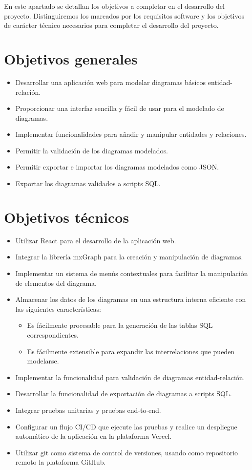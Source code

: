 
En este apartado se detallan los objetivos a completar en el desarrollo del proyecto. Distinguiremos los marcados por los requisitos software y los objetivos de carácter técnico necesarios para completar el desarrollo del proyecto.

\section{Objetivos generales}
\begin{itemize}
\tightlist
    \item Desarrollar una aplicación web para modelar diagramas básicos entidad-relación.
    \item Proporcionar una interfaz sencilla y fácil de usar para el modelado de diagramas.
    \item Implementar funcionalidades para añadir y manipular entidades y relaciones.
    \item Permitir la validación de los diagramas modelados.
    \item Permitir exportar e importar los diagramas modelados como JSON.
    \item Exportar los diagramas validados a scripts SQL.
\end{itemize}

\section{Objetivos técnicos}
\begin{itemize}
\tightlist
    \item Utilizar React para el desarrollo de la aplicación web.
    \item Integrar la librería mxGraph para la creación y manipulación de diagramas.
    \item Implementar un sistema de menús contextuales para facilitar la manipulación de elementos del diagrama.
    \item Almacenar los datos de los diagramas en una estructura interna eficiente con las siguientes características:
    \begin{itemize}
        \item Es fácilmente procesable para la generación de las tablas SQL correspondientes.
        \item Es fácilmente extensible para expandir las interrelaciones que pueden modelarse.
    \end{itemize}
    \item Implementar la funcionalidad para validación de diagramas entidad-relación.
    \item Desarrollar la funcionalidad de exportación de diagramas a scripts SQL.
    \item Integrar pruebas unitarias y pruebas end-to-end.
    \item Configurar un flujo CI/CD que ejecute las pruebas y realice un despliegue automático de la aplicación en la plataforma Vercel.
    \item Utilizar git como sistema de control de versiones, usando como repositorio remoto la plataforma GitHub.
\end{itemize}